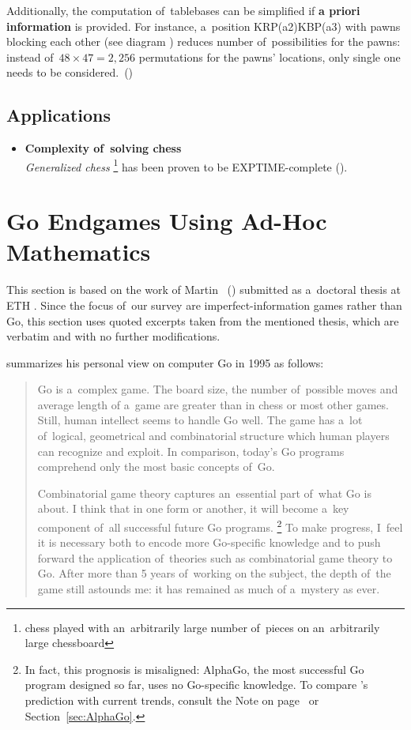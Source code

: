 Additionally, the computation of~tablebases can be simplified if \textbf{a priori information} is provided.
For instance, a~position KRP(a2)KBP(a3) with pawns blocking each other (see diagram \todo) reduces number of~possibilities for the pawns:
instead of~$48 \times 47 = 2,256$ permutations for the pawns' locations, only single one needs to be considered.~(\cite{Herik1987sixmenendgame})

\subsection{Applications}
\begin{itemize}
  \item \textbf{Complexity of~solving chess}
    \\
    \emph{Generalized chess}%
    \footnote{chess played with an~arbitrarily large number of~pieces on an~arbitrarily large chessboard}
    has been proven to be EXPTIME-complete (\cite{Fraenkel1981computing}).
\end{itemize}

\todo

\section{Go Endgames Using Ad-Hoc Mathematics}

This section is based on the work of Martin~\Mueller{} (\cite{Muller1995computer}) submitted as a~doctoral thesis at ETH \Zurich.
Since the focus of~our survey are imperfect-information games rather than Go, this section uses quoted excerpts taken from the mentioned thesis, which are verbatim and with no further modifications.

\Mueller{} summarizes his personal view on computer Go in 1995 as follows:
\begin{quotation}
  Go is a~complex game.
  The board size, the number of~possible moves and average length of a~game are greater than in chess or most other games.
  Still, human intellect seems to handle Go well.
  The game has a~lot of~logical, geometrical and combinatorial structure which human players can recognize and exploit.
  In comparison, today’s Go programs comprehend only the most basic concepts of~Go.

  Combinatorial game theory captures an~essential part of~what Go is about.
  I think that in one form or another, it will become a~key component of~all successful future Go programs.%
  \footnote{
    In fact, this prognosis is misaligned:
    AlphaGo, the most successful Go program designed so far, uses no Go-specific knowledge.
    To compare \Mueller's prediction with current trends, consult the Note on page~\pageref{note:CGTvsAlphaGo} or Section~\ref{sec:AlphaGo}.
  }
  To make progress, I~feel it is necessary both to encode more Go-specific knowledge and to push forward the application of~theories such as combinatorial game theory to Go.
  After more than 5 years of~working on the subject, the depth of~the game still astounds me:
  it has remained as much of a~mystery as ever.
\end{quotation}

